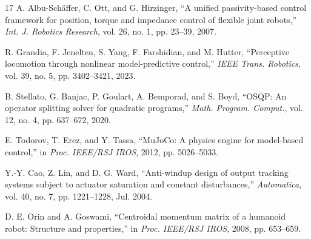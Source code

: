 \documentclass[journal]{IEEEtran}
\theoremstyle{plain}
\theoremstyle{definition}
\begin{document}
\begin{thebibliography}{17}
 A. Albu-Sch\"affer, C. Ott, and G. Hirzinger, ``A unified passivity-based control framework for position, torque and impedance control of flexible joint robots,'' \emph{Int. J. Robotics Research}, vol. 26, no. 1, pp. 23--39, 2007.

 R. Grandia, F. Jenelten, S. Yang, F. Farshidian, and M. Hutter, ``Perceptive locomotion through nonlinear model-predictive control,'' \emph{IEEE Trans. Robotics}, vol. 39, no. 5, pp. 3402--3421, 2023.

 B. Stellato, G. Banjac, P. Goulart, A. Bemporad, and S. Boyd, ``OSQP: An operator splitting solver for quadratic programs,'' \emph{Math. Program. Comput.}, vol. 12, no. 4, pp. 637--672, 2020.

 E. Todorov, T. Erez, and Y. Tassa, ``MuJoCo: A physics engine for model-based control,'' in \emph{Proc. IEEE/RSJ IROS}, 2012, pp. 5026--5033.

 Y.-Y. Cao, Z. Lin, and D. G. Ward, ``Anti-windup design of output tracking systems subject to actuator saturation and constant disturbances,'' \emph{Automatica}, vol. 40, no. 7, pp. 1221--1228, Jul. 2004.

 D. E. Orin and A. Goswami, ``Centroidal momentum matrix of a humanoid robot: Structure and properties,'' in \emph{Proc. IEEE/RSJ IROS}, 2008, pp. 653--659.

\end{thebibliography}
\end{document}
